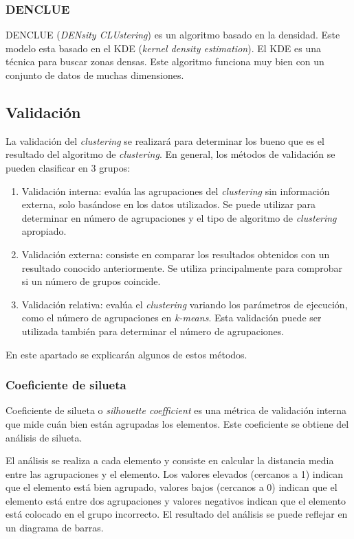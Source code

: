 \subsubsection{DENCLUE}
DENCLUE (\emph{DENsity CLUstering}) \cite{REHIOUI2016560} es un algoritmo basado en la densidad. Este modelo esta basado en el KDE (\emph{kernel density estimation}). El KDE es una técnica para buscar zonas densas. Este algoritmo funciona muy bien con un conjunto de datos de muchas dimensiones.

\subsection{Validación}
La validación del \emph{clustering} \cite{clusteringValidation} se realizará para determinar los bueno que es el resultado del algoritmo de \emph{clustering}. En general, los métodos de validación se pueden clasificar en 3 grupos:
\begin{enumerate}
	\item Validación interna: evalúa las agrupaciones del \emph{clustering} sin información externa, solo basándose en los datos utilizados. Se puede utilizar para determinar en número de agrupaciones y el tipo de algoritmo de \emph{clustering} apropiado.
	\item Validación externa: consiste en comparar los resultados obtenidos con un resultado conocido anteriormente. Se utiliza principalmente para comprobar si un número de grupos coincide.
	\item Validación relativa: evalúa el \emph{clustering} variando los parámetros de ejecución, como el número de agrupaciones en \emph{k-means}. Esta validación puede ser utilizada también para determinar el número de agrupaciones.
\end{enumerate}

En este apartado se explicarán algunos de estos métodos.

\subsubsection{Coeficiente de silueta}
Coeficiente de silueta o \emph{silhouette coefficient} es una métrica de validación interna que mide cuán bien están agrupadas los elementos. Este coeficiente se obtiene del análisis de silueta.

El análisis se realiza a cada elemento y consiste en calcular la distancia media entre las agrupaciones y el elemento. Los valores elevados (cercanos a 1) indican que el elemento está bien agrupado, valores bajos (cercanos a 0) indican que el elemento está entre dos agrupaciones y valores negativos indican que el elemento está colocado en el grupo incorrecto. El resultado del análisis se puede reflejar en un diagrama de barras.


